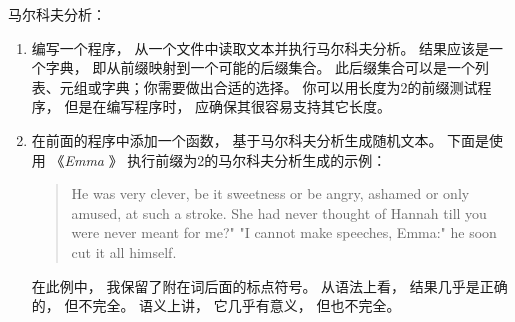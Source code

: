 \begin{exercise}
马尔科夫分析：
\begin{enumerate}

\item 编写一个程序， 从一个文件中读取文本并执行马尔科夫分析。  
   结果应该是一个字典， 即从前缀映射到一个可能的后缀集合。  
   此后缀集合可以是一个列表、元组或字典；你需要做出合适的选择。  
   你可以用长度为2的前缀测试程序， 但是在编写程序时， 应确保其很容易支持其它长度。  


\item 在前面的程序中添加一个函数， 基于马尔科夫分析生成随机文本。  
   下面是使用 《{\em Emma} 》 执行前缀为2的马尔科夫分析生成的示例：

\begin{quote}
He was very clever, be it sweetness or be angry, ashamed or only
amused, at such a stroke. She had never thought of Hannah till you
were never meant for me?" "I cannot make speeches, Emma:" he soon cut
it all himself.
\end{quote}

在此例中， 我保留了附在词后面的标点符号。  从语法上看， 结果几乎是正确的， 但不完全。  
语义上讲， 它几乎有意义， 但也不完全。  


\end{enumerate}
\end{exercise}
